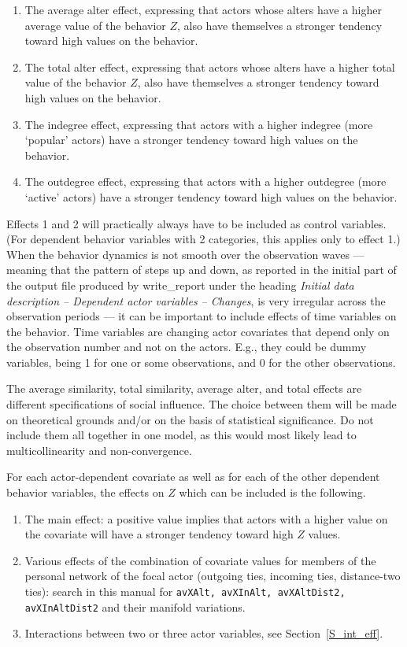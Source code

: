 \documentclass[a4paper,fleqn,11pt]{article}
\newcommand{\+}{\, + \,}
\newcommand{\sfn}[1]{\textsf{#1}}
\begin{document}
\begin{enumerate}
      to being similar to their alters,
      where the total influence of the alters is proportional to
      the number of alters.
\item The average alter effect, expressing that actors
      whose alters have a higher average value of the behavior $Z$,
      also have themselves a stronger tendency toward high values on the behavior.
\item The total alter effect, expressing that actors
      whose alters have a higher total value of the behavior $Z$,
      also have themselves a stronger tendency toward high values on the behavior.
\item The indegree effect, expressing that actors with a higher indegree
      (more `popular' actors) have a stronger tendency toward high values on the behavior.
\item The outdegree effect, expressing that actors with a higher outdegree
      (more `active' actors) have a stronger tendency toward high values on the behavior.
\end{enumerate}
Effects 1 and 2 will practically always have to be included as control variables.
(For dependent behavior variables with 2 categories, this applies only to effect 1.)
When the behavior dynamics is not smooth over the observation waves --- meaning that
the pattern of steps up and down, as reported in the initial part of the
output file produced by \sfn{write\_report}
under the heading \emph{Initial data description -- Dependent actor variables -- Changes},
is very irregular across the observation periods --- it can be important to include
effects of time variables on the behavior.
Time variables are changing actor covariates that depend only on the
observation number and not on the actors. E.g., they could be dummy variables, being 1
for one or some observations, and 0 for the other observations.

The average similarity, total similarity, average alter, and total effects
are different specifications of social influence.
The choice between them will be made on theoretical grounds
and/or on the basis of statistical significance.
Do not include them all together in one model, as this would most likely
lead to multicollinearity and non-convergence.
\medskip

For each actor-dependent covariate as well as for each of the other
dependent behavior variables,
the effects on $Z$ which can be included is the following.
\begin{enumerate}
\item The main effect: a positive value implies that actors with a
      higher value on the covariate will have a stronger tendency
      toward high $Z$ values.
\item Various effects of the combination of covariate values for members
      of the personal network of the focal actor (outgoing ties, incoming
      ties, distance-two ties): search in this manual for \texttt{avXAlt,
      avXInAlt, avXAltDist2, avXInAltDist2} and their manifold variations.
\item Interactions between two or three actor variables, see
      Section~\ref{S_int_eff}.
\end{enumerate}
\end{document}
